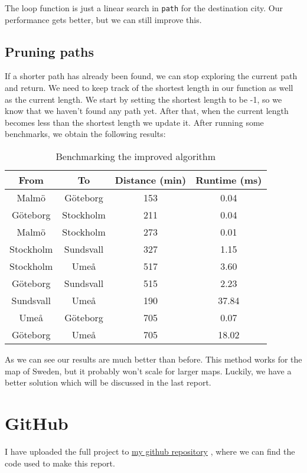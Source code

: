 \documentclass[a4paper,11pt]{article}
\newcommand{\underlinehref}[2]{%
    \href{#1}{\ul{#2}}%
}
\begin{document}
    The loop function is just a linear search in {\tt path} for the destination city.
    Our performance gets better, but we can still improve this.

    \subsection*{Pruning paths}

    If a shorter path has already been found, we can stop exploring the current path and return.
    We need to keep track of the shortest length in our function as well as the current length.
    We start by setting the shortest length to be -1, so we know that we haven't found any path yet.
    After that, when the current length becomes less than the shortest length we update it.
    After running some benchmarks, we obtain the following results:

    \begin{table}[H]
        \begin{center}
            \begin{tabular}{c|c|c|c}
                \textbf{From} & \textbf{To} & \textbf{Distance (min)} & \textbf{Runtime (ms)}\\
                \hline
                Malmö  &   Göteborg     &  153 &     0.04\\
                Göteborg &    Stockholm    &  211 &     0.04\\
                Malmö &    Stockholm    &  273 &     0.01\\
                Stockholm &    Sundsvall    &  327 &     1.15\\
                Stockholm &    Umeå    &  517 &     3.60\\
                Göteborg &    Sundsvall    &  515 &     2.23\\
                Sundsvall &    Umeå    &  190 &     37.84\\
                Umeå &    Göteborg    &  705 &     0.07\\
                Göteborg &    Umeå    &  705 &     18.02\\
            \end{tabular}
            \caption{Benchmarking the improved algorithm}
            \label{tab:table2}
        \end{center}
    \end{table}

    As we can see our results are much better than before.
    This method works for the map of Sweden, but it probably won't scale for larger maps.
    Luckily, we have a better solution which will be discussed in the last report.

    \section*{GitHub}
    I have uploaded the full project to \underlinehref{https://github.com/peterherczku/ID1021/tree/main/assignment-9}{my github repository}, where we can find the code used to make this report.
\end{document}
